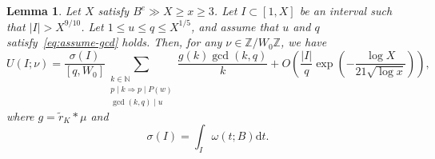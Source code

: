 \documentclass[11pt,letterpaper]{amsart}
\renewcommand{\leq}{\leqslant}
\renewcommand{\geq}{\geqslant}
\renewcommand{\d}{\mathrm{d}}
\newtheorem{lemma}[theorem]{Lemma}
\theoremstyle{definition}
\numberwithin{equation}{section}
\newcommand\ZZ{\mathbb{Z}}
\newcommand\NN{\mathbb{N}}
\newcommand{\0}{\mathbf{0}}
\begin{document}
\begin{lemma}\label{lem:AAA}
Let $X$ satisfy $B^e\gg X\geq x\geq 3$. Let $I\subset [1,X]$ be an interval such that $|I|>X^{9/10}$.
Let $1\leq u\leq q\leq X^{1/5}$, and assume that $u$ and $q$ satisfy~\eqref{eq:assume-gcd} holds.
Then, for any $\nu\in \ZZ/W_0\ZZ$, we have
$$
U(I;\nu)=
\frac{\sigma(I)}{[q,W_0]} 
\sum_{\substack{k\in \NN\\
p\mid k \Rightarrow p \mid P(w)\\
\gcd(k,q)\mid u}} 
\frac{g(k)\gcd(k,q) }{k}
+
O\left(\frac{|I|}{q}
\exp\left(-\frac{\log X}{21\sqrt{\log x}} \right)\right),
$$
where $g=\tilde r_K* \mu$ and 
\begin{equation}\label{eq:def-I(x)}
\sigma(I)=\int_{I} \omega(t;B)\d t.
\end{equation}
\end{lemma}
\end{document}
